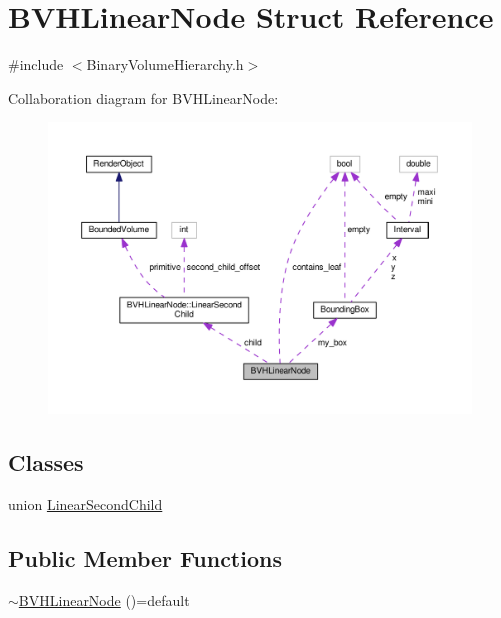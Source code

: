 \hypertarget{structBVHLinearNode}{}\section{B\+V\+H\+Linear\+Node Struct Reference}
\label{structBVHLinearNode}


{\ttfamily \#include $<$Binary\+Volume\+Hierarchy.\+h$>$}



Collaboration diagram for B\+V\+H\+Linear\+Node\+:\nopagebreak
\begin{figure}[H]
\begin{center}
\leavevmode
\includegraphics[width=350pt]{structBVHLinearNode__coll__graph}
\end{center}
\end{figure}
\subsection*{Classes}
\begin{DoxyCompactItemize}
\item 
union \hyperlink{unionBVHLinearNode_1_1LinearSecondChild}{Linear\+Second\+Child}
\end{DoxyCompactItemize}
\subsection*{Public Member Functions}
\begin{DoxyCompactItemize}
\item 
\hyperlink{structBVHLinearNode_ab0e9e423108e944c8c7c5ab6a35aa615}{$\sim$\+B\+V\+H\+Linear\+Node} ()=default
\end{DoxyCompactItemize}
